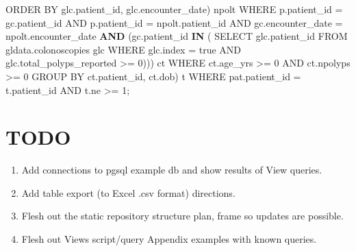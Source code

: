 \documentclass[]{article}
\newenvironment{Shaded}{\begin{snugshade}}{\end{snugshade}}
\newcommand{\KeywordTok}[1]{\textcolor[rgb]{0.13,0.29,0.53}{\textbf{{#1}}}}
\newcommand{\DataTypeTok}[1]{\textcolor[rgb]{0.13,0.29,0.53}{{#1}}}
\newcommand{\DecValTok}[1]{\textcolor[rgb]{0.00,0.00,0.81}{{#1}}}
\newcommand{\StringTok}[1]{\textcolor[rgb]{0.31,0.60,0.02}{{#1}}}
\newcommand{\NormalTok}[1]{{#1}}
\providecommand{\tightlist}{%
  \setlength{\itemsep}{0pt}\setlength{\parskip}{0pt}}
\begin{document}
\begin{Shaded}
\begin{Highlighting}[]
           \NormalTok{ORDER BY glc.patient_id, glc.encounter_date) npolt}
         \NormalTok{WHERE }\DataTypeTok{p.patient_id =} \NormalTok{gc.patient_id}
         \NormalTok{AND }\DataTypeTok{p.patient_id =} \NormalTok{npolt.patient_id }
         \NormalTok{AND }\DataTypeTok{gc.encounter_date =} \NormalTok{npolt.encounter_date }
         \KeywordTok{AND} \NormalTok{(gc.patient_id }\KeywordTok{IN} \NormalTok{( SELECT glc.patient_id}
                                       \NormalTok{FROM gldata.colonoscopies glc}
                                       \NormalTok{WHERE }\DataTypeTok{glc.index =} \NormalTok{true AND glc.total_polyps_reported >=}\StringTok{ }\DecValTok{0}\NormalTok{))) ct}
  \NormalTok{WHERE ct.age_yrs >=}\StringTok{ }\DecValTok{0} \NormalTok{AND ct.npolyps >=}\StringTok{ }\DecValTok{0}
  \NormalTok{GROUP BY ct.patient_id, ct.dob) t}
\NormalTok{WHERE pat.patient_id =}\StringTok{ }\NormalTok{t.patient_id}
\NormalTok{AND t.ne >=}\StringTok{ }\DecValTok{1}\NormalTok{;}
\end{Highlighting}
\end{Shaded}

\section{TODO}\label{todo-1}

\begin{enumerate}
\def\labelenumi{\arabic{enumi}.}
\tightlist
\item
  Add connections to pgsql example db and show results of View queries.
\item
  Add table export (to Excel .csv format) directions.
\item
  Flesh out the static repository structure plan, frame so updates are
  possible.
\item
  Flesh out Views script/query Appendix examples with known queries.
\end{enumerate}
\end{document}
